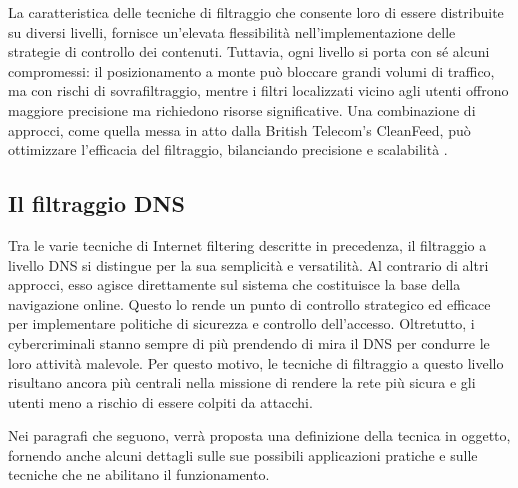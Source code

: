 La caratteristica delle tecniche di filtraggio che consente loro di essere distribuite su diversi livelli, fornisce un'elevata flessibilità nell'implementazione delle strategie di controllo dei contenuti.
Tuttavia, ogni livello si porta con sé alcuni compromessi: il posizionamento a monte può bloccare grandi volumi di traffico, ma con rischi di sovrafiltraggio, mentre i filtri localizzati vicino agli utenti offrono maggiore precisione ma richiedono risorse significative. Una combinazione di approcci, come quella messa in atto dalla British Telecom’s CleanFeed, può ottimizzare l'efficacia del filtraggio, bilanciando precisione e scalabilità \cite{Varadharajan2010}.

\subsection{Il filtraggio DNS}
Tra le varie tecniche di Internet filtering descritte in precedenza, il filtraggio a livello DNS si distingue per la sua semplicità e versatilità. Al contrario di altri approcci, esso agisce direttamente sul sistema che costituisce la base della navigazione online. Questo lo rende un punto di controllo strategico ed efficace per implementare politiche di sicurezza e controllo dell'accesso. Oltretutto, i cybercriminali stanno sempre di più prendendo di mira il DNS per condurre le loro attività malevole. Per questo motivo, le tecniche di filtraggio a questo livello risultano ancora più centrali nella missione di rendere la rete più sicura e gli utenti meno a rischio di essere colpiti da attacchi.

Nei paragrafi che seguono, verrà proposta una definizione della tecnica in oggetto, fornendo anche alcuni dettagli sulle sue possibili applicazioni pratiche e sulle tecniche che ne abilitano il funzionamento.


